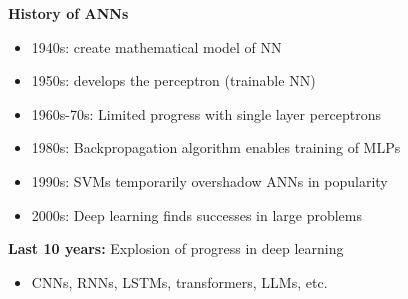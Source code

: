 \begin{frame}

    \textbf{History of ANNs}

    \begin{itemize}
        \item 1940s:  create mathematical model of NN
        \vspace{0.5em}
        \item 1950s:  develops the perceptron (trainable NN)
        \vspace{0.5em}
        \item 1960s-70s: Limited progress with single layer perceptrons
        \vspace{0.5em}
        \item 1980s: Backpropagation algorithm enables training of MLPs
        \vspace{0.5em}
        \item 1990s: SVMs temporarily overshadow ANNs in popularity
        \vspace{0.5em}
        \item 2000s: Deep learning finds successes in large problems
    \end{itemize}
    
        \vspace{0.5em}
        \vspace{0.5em}
    \textbf{Last 10 years:} Explosion of progress in deep learning 

    \begin{itemize}
        \item CNNs, RNNs, LSTMs, transformers, LLMs, etc.
    \end{itemize}

\end{frame}



